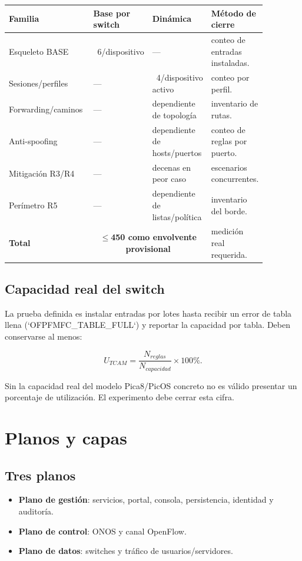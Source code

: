 \documentclass[11pt,a4paper]{article}
\begin{document}
\begin{longtable}{p{0.33\linewidth}p{0.16\linewidth}p{0.18\linewidth}p{0.2\linewidth}}
\toprule
Familia & Base por switch & Dinámica & Método de cierre\\
\midrule
Esqueleto BASE & ~6/dispositivo & --- & conteo de entradas instaladas.\\
Sesiones/perfiles & --- & ~4/dispositivo activo & conteo por perfil.\\
Forwarding/caminos & --- & dependiente de topología & inventario de rutas.\\
Anti-spoofing & --- & dependiente de hosts/puertos & conteo de reglas por puerto.\\
Mitigación R3/R4 & --- & decenas en peor caso & escenarios concurrentes.\\
Perímetro R5 & --- & dependiente de listas/política & inventario del borde.\\
\textbf{Total} & \multicolumn{2}{c}{\textbf{$\leq$450 como envolvente provisional}} & medición real requerida.\\
\bottomrule
\end{longtable}

\subsection{Capacidad real del switch}

La prueba definida es instalar entradas por lotes hasta recibir un error de tabla llena (`OFPFMFC\_TABLE\_FULL`) y reportar la capacidad por tabla. Deben conservarse al menos:

\begin{equation}
U_{TCAM}=\frac{N_{reglas}}{N_{capacidad}}\times100\%.
\end{equation}

Sin la capacidad real del modelo Pica8/PicOS concreto no es válido presentar un porcentaje de utilización. El experimento debe cerrar esta cifra.

\section{Planos y capas}

\subsection{Tres planos}

\begin{itemize}
\item \textbf{Plano de gestión}: servicios, portal, consola, persistencia, identidad y auditoría.
\item \textbf{Plano de control}: ONOS y canal OpenFlow.
\item \textbf{Plano de datos}: switches y tráfico de usuarios/servidores.
\end{itemize}
\end{document}
